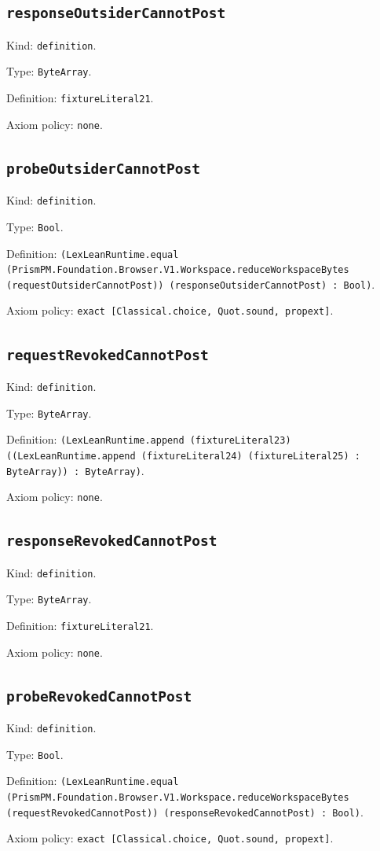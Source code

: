 \documentclass[11pt]{article}
\begin{document}
\subsection*{\texttt{responseOutsiderCannotPost}}
\noindent Kind: \texttt{definition}.\par
\noindent Type: \texttt{ByteArray}.\par
\noindent Definition: \texttt{fixtureLiteral21}.\par
\noindent Axiom policy: \texttt{none}.\par
\subsection*{\texttt{probeOutsiderCannotPost}}
\noindent Kind: \texttt{definition}.\par
\noindent Type: \texttt{Bool}.\par
\noindent Definition: \texttt{(LexLeanRuntime.equal (PrismPM.Foundation.Browser.V1.Workspace.reduceWorkspaceBytes (requestOutsiderCannotPost)) (responseOutsiderCannotPost) : Bool)}.\par
\noindent Axiom policy: \texttt{exact [Classical.choice, Quot.sound, propext]}.\par
\subsection*{\texttt{requestRevokedCannotPost}}
\noindent Kind: \texttt{definition}.\par
\noindent Type: \texttt{ByteArray}.\par
\noindent Definition: \texttt{(LexLeanRuntime.append (fixtureLiteral23) ((LexLeanRuntime.append (fixtureLiteral24) (fixtureLiteral25) : ByteArray)) : ByteArray)}.\par
\noindent Axiom policy: \texttt{none}.\par
\subsection*{\texttt{responseRevokedCannotPost}}
\noindent Kind: \texttt{definition}.\par
\noindent Type: \texttt{ByteArray}.\par
\noindent Definition: \texttt{fixtureLiteral21}.\par
\noindent Axiom policy: \texttt{none}.\par
\subsection*{\texttt{probeRevokedCannotPost}}
\noindent Kind: \texttt{definition}.\par
\noindent Type: \texttt{Bool}.\par
\noindent Definition: \texttt{(LexLeanRuntime.equal (PrismPM.Foundation.Browser.V1.Workspace.reduceWorkspaceBytes (requestRevokedCannotPost)) (responseRevokedCannotPost) : Bool)}.\par
\noindent Axiom policy: \texttt{exact [Classical.choice, Quot.sound, propext]}.\par
\end{document}
